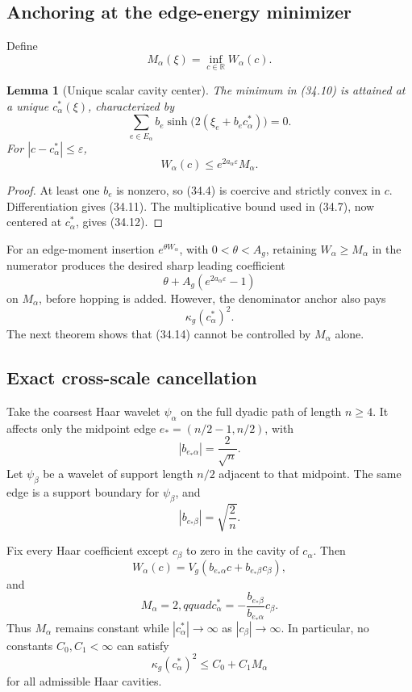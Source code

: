 \documentclass[11pt]{article}
\newtheorem{lemma}[theorem]{Lemma}
\theoremstyle{remark}
\begin{document}
\subsection{Anchoring at the edge-energy minimizer}

Define
\[
 M_\alpha(\xi)=\inf_{c\in\mathbb R}W_\alpha(c).    \tag{34.10}
\]

\begin{lemma}[Unique scalar cavity center]
\label{lem:v17v34-center}
The minimum in (34.10) is attained at a unique \(c_\alpha^*(\xi)\),
characterized by
\[
 \sum_{e\in E_\alpha}
 b_e\sinh\bigl(2(\xi_e+b_ec_\alpha^*)\bigr)=0.    \tag{34.11}
\]
For \(|c-c_\alpha^*|\leq\varepsilon\),
\[
 W_\alpha(c)
 \leq e^{2a_\alpha\varepsilon}M_\alpha.           \tag{34.12}
\]
\end{lemma}

\begin{proof}
At least one \(b_e\) is nonzero, so (34.4) is coercive and strictly
convex in \(c\).  Differentiation gives (34.11).  The multiplicative
bound used in (34.7), now centered at \(c_\alpha^*\), gives (34.12).
\end{proof}

For an edge-moment insertion \(e^{\theta W_\alpha}\), with
\(0<\theta<A_g\), retaining
\(W_\alpha\geq M_\alpha\) in the numerator produces the desired sharp
leading coefficient
\[
 \theta+A_g(e^{2a_\alpha\varepsilon}-1)            \tag{34.13}
\]
on \(M_\alpha\), before hopping is added.  However, the denominator
anchor also pays
\[
 \kappa_g(c_\alpha^*)^2.                           \tag{34.14}
\]
The next theorem shows that (34.14) cannot be controlled by
\(M_\alpha\) alone.

\subsection{Exact cross-scale cancellation}

Take the coarsest Haar wavelet \(\psi_\alpha\) on the full dyadic path
of length \(n\geq4\).  It affects only the midpoint edge
\(e_*=(n/2-1,n/2)\), with
\[
 |b_{e_*\alpha}|=\frac2{\sqrt n}.                  \tag{34.15}
\]
Let \(\psi_\beta\) be a wavelet of support length \(n/2\) adjacent to
that midpoint.  The same edge is a support boundary for
\(\psi_\beta\), and
\[
 |b_{e_*\beta}|=\sqrt{\frac2n}.                   \tag{34.16}
\]

\begin{countertheorem}
\label{ctr:v17v34-cancellation}
Fix every Haar coefficient except \(c_\beta\) to zero in the cavity of
\(c_\alpha\).  Then
\[
 W_\alpha(c)
 =V_g(b_{e_*\alpha}c+b_{e_*\beta}c_\beta),         \tag{34.17}
\]
and
\[
 M_\alpha=2,qquad
 c_\alpha^*
 =-\frac{b_{e_*\beta}}{b_{e_*\alpha}}c_\beta.     \tag{34.18}
\]
Thus \(M_\alpha\) remains constant while
\(|c_\alpha^*|\to\infty\) as \(|c_\beta|\to\infty\).  In
particular, no constants \(C_0,C_1<\infty\) can satisfy
\[
 \kappa_g(c_\alpha^*)^2\leq C_0+C_1M_\alpha       \tag{34.19}
\]
for all admissible Haar cavities.
\end{countertheorem}
\end{document}
